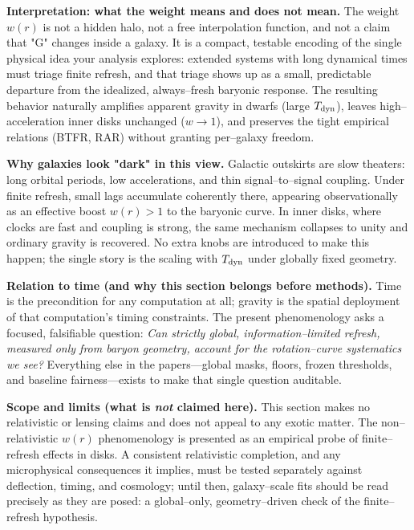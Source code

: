 \documentclass[usenatbib]{mnras}
\begin{document}
\vspace{0.5em}
\noindent\textbf{Interpretation: what the weight means and does not mean.}
The weight \(w(r)\) is not a hidden halo, not a free interpolation function, and not a claim that "G" changes inside a galaxy. It is a compact, testable encoding of the single physical idea your analysis explores:
extended systems with long dynamical times must triage finite refresh, and that triage shows up as a small, predictable departure from the idealized, always–fresh baryonic response.
The resulting behavior naturally amplifies apparent gravity in dwarfs (large \(T_{\rm dyn}\)), leaves high–acceleration inner disks unchanged (\(w\to 1\)), and preserves the tight empirical relations (BTFR, RAR) without granting per–galaxy freedom.

\vspace{0.5em}
\noindent\textbf{Why galaxies look "dark" in this view.}
Galactic outskirts are slow theaters: long orbital periods, low accelerations, and thin signal–to–signal coupling. Under finite refresh, small lags accumulate coherently there, appearing observationally as an effective boost \(w(r)>1\) to the baryonic curve. In inner disks, where clocks are fast and coupling is strong, the same mechanism collapses to unity and ordinary gravity is recovered. No extra knobs are introduced to make this happen; the single story is the scaling with \(T_{\rm dyn}\) under globally fixed geometry.

\vspace{0.5em}
\noindent\textbf{Relation to time (and why this section belongs before methods).}
Time is the precondition for any computation at all; gravity is the spatial deployment of that computation's timing constraints. The present phenomenology asks a focused, falsifiable question: \emph{Can strictly global, information–limited refresh, measured only from baryon geometry, account for the rotation–curve systematics we see?}
Everything else in the papers—global masks, floors, frozen thresholds, and baseline fairness—exists to make that single question auditable.

\vspace{0.5em}
\noindent\textbf{Scope and limits (what is \emph{not} claimed here).}
This section makes no relativistic or lensing claims and does not appeal to any exotic matter. The non–relativistic \(w(r)\) phenomenology is presented as an empirical probe of finite–refresh effects in disks. A consistent relativistic completion, and any microphysical consequences it implies, must be tested separately against deflection, timing, and cosmology; until then, galaxy–scale fits should be read precisely as they are posed: a global–only, geometry–driven check of the finite–refresh hypothesis.
\end{document}
